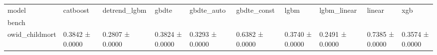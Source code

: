 \begin{tabular}{llllllllll}
\toprule
model & catboost & detrend_lgbm & gbdte & gbdte_auto & gbdte_const & lgbm & lgbm_linear & linear & xgb \\
bench &  &  &  &  &  &  &  &  &  \\
\midrule
owid_childmort & 0.3842 ± 0.0000 & 0.2807 ± 0.0000 & 0.3824 ± 0.0000 & 0.3293 ± 0.0000 & 0.6382 ± 0.0000 & 0.3740 ± 0.0000 & 0.2491 ± 0.0000 & 0.7385 ± 0.0000 & 0.3574 ± 0.0000 \\
\bottomrule
\end{tabular}
